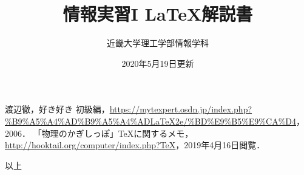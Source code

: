 \documentclass[a4j]{jsarticle}
\begin{document}
\title{情報実習I \LaTeX 解説書}
\date{2020年5月19日更新}
\author{近畿大学理工学部情報学科}

\maketitle








\begin{thebibliography}{1}
    渡辺徹，好き好き \LaTeXe 初級編，\url{https://mytexpert.osdn.jp/index.php?%B9%A5%A4%AD%B9%A5%A4%ADLaTeX2e/%BD%E9%B5%E9%CA%D4}，2006．
    「物理のかぎしっぽ」\TeX に関するメモ，\url{http://hooktail.org/computer/index.php?TeX}，2019年4月16日閲覧．
\end{thebibliography}

\begin{flushright}
以上
\end{flushright}
\end{document}
